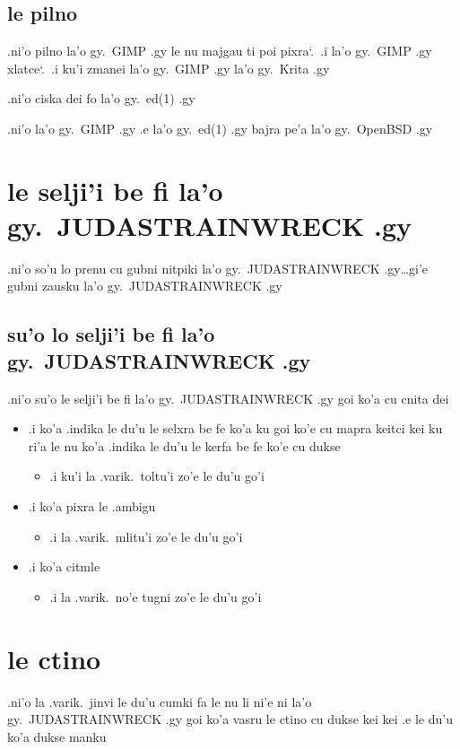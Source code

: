 \documentclass{report}
\newcommand\sds{\spacefactor\sfcode`.\ \space}
\begin{document}
\subsection{le pilno}
.ni'o pilno la'o gy.\ GIMP .gy le nu majgau ti poi pixra\sds  .i  la'o gy.\ GIMP .gy xlatce\sds  .i ku'i zmanei la'o gy.\ GIMP .gy la'o gy.\ Krita .gy

.ni'o ciska dei fo la'o gy.\ ed(1) .gy

.ni'o la'o gy.\ GIMP .gy .e la'o gy.\ ed(1) .gy bajra pe'a la'o gy.\ OpenBSD .gy

\section{le selji'i be fi la'o gy.\ JUDASTRAINWRECK .gy}
.ni'o so'u lo prenu cu gubni nitpiki la'o gy.\ JUDASTRAINWRECK .gy\ldots gi'e gubni zausku la'o gy.\ JUDASTRAINWRECK .gy

\subsection{su'o lo selji'i be fi la'o gy.\ JUDASTRAINWRECK .gy}
.ni'o su'o le selji'i be fi la'o gy.\ JUDASTRAINWRECK .gy goi ko'a cu cnita dei

\begin{itemize}
	\item .i ko'a .indika le du'u le selxra be fe ko'a ku goi ko'e cu mapra keitci kei ku ri'a le nu ko'a .indika le du'u le kerfa be fe ko'e cu dukse 
	\begin{itemize}
		\item .i ku'i la .varik.\ toltu'i zo'e le du'u go'i
	\end{itemize}
	\item .i ko'a pixra le .ambigu
	\begin{itemize}
		\item .i la .varik.\ mlitu'i zo'e le du'u go'i
	\end{itemize}
	\item .i ko'a citmle
	\begin{itemize}
		\item .i la .varik.\ no'e tugni zo'e le du'u go'i
	\end{itemize}
\end{itemize}
\section{le ctino}
.ni'o la .varik.\ jinvi le du'u cumki fa le nu li ni'e ni la'o gy.\ JUDASTRAINWRECK .gy goi ko'a vasru le ctino cu dukse kei kei .e le du'u ko'a dukse manku
\end{document}
